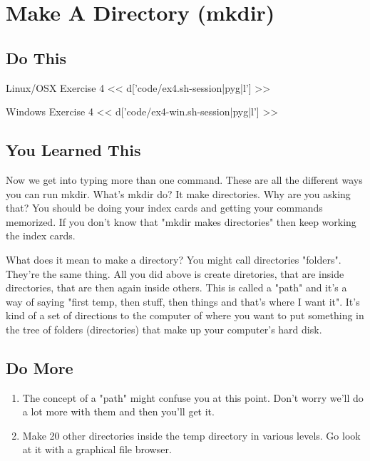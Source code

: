 \chapter{Make A Directory (mkdir)}

\section{Do This}

\begin{code}{Linux/OSX Exercise 4}
<< d['code/ex4.sh-session|pyg|l'] >>
\end{code}

\begin{code}{Windows Exercise 4}
<< d['code/ex4-win.sh-session|pyg|l'] >>
\end{code}

\section{You Learned This}

Now we get into typing more than one command.  These are all the different ways
you can run mkdir.  What's mkdir do?  It make directories.  Why are you asking
that?  You should be doing your index cards and getting your commands memorized.
If you don't know that "mkdir makes directories" then keep working the index
cards.

What does it mean to make a directory?  You might call directories "folders".  They're
the same thing.  All you did above is create diretories, that are inside directories,
that are then again inside others.  This is called a "path" and it's a way of saying
"first temp, then stuff, then things and that's where I want it".  It's kind of a
set of directions to the computer of where you want to put something in the tree
of folders (directories) that make up your computer's hard disk.

\section{Do More}

\begin{enumerate}
\item The concept of a "path" might confuse you at this point.  Don't worry we'll 
    do a lot more with them and then you'll get it.
\item Make 20 other directories inside the temp directory in various levels.  Go look at it
    with a graphical file browser.
\end{enumerate}

